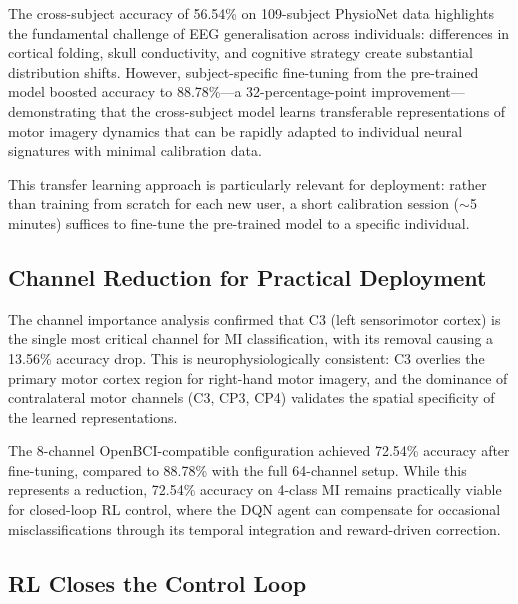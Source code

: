 \documentclass[12pt, a4paper]{article}
\begin{document}
The cross-subject accuracy of 56.54\% on 109-subject PhysioNet data highlights the fundamental challenge of EEG generalisation across individuals: differences in cortical folding, skull conductivity, and cognitive strategy create substantial distribution shifts. However, subject-specific fine-tuning from the pre-trained model boosted accuracy to 88.78\%---a 32-percentage-point improvement---demonstrating that the cross-subject model learns transferable representations of motor imagery dynamics that can be rapidly adapted to individual neural signatures with minimal calibration data.

This transfer learning approach is particularly relevant for deployment: rather than training from scratch for each new user, a short calibration session ($\sim$5 minutes) suffices to fine-tune the pre-trained model to a specific individual.

\subsection{Channel Reduction for Practical Deployment}

The channel importance analysis confirmed that C3 (left sensorimotor cortex) is the single most critical channel for MI classification, with its removal causing a 13.56\% accuracy drop. This is neurophysiologically consistent: C3 overlies the primary motor cortex region for right-hand motor imagery, and the dominance of contralateral motor channels (C3, CP3, CP4) validates the spatial specificity of the learned representations.

The 8-channel OpenBCI-compatible configuration achieved 72.54\% accuracy after fine-tuning, compared to 88.78\% with the full 64-channel setup. While this represents a reduction, 72.54\% accuracy on 4-class MI remains practically viable for closed-loop RL control, where the DQN agent can compensate for occasional misclassifications through its temporal integration and reward-driven correction.

\subsection{RL Closes the Control Loop}
\end{document}
